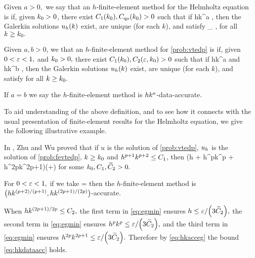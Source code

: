 \label{def:hkqo}
Given $a > 0,$ we say that an $h$-finite-element method for the Helmholtz equation is  if, given $k_{0} > 0$, there exist $C_{1}(k_{0}), C_{\mathrm{qo}}(k_{0}) > 0$ such that if
\beqs
hk^{a} \leq \Co,
\eeqs
then the Galerkin solutions $u_{h}(k)$ exist, are unique (for each $k$), and satisfy
\beqs
{} \leq \Cqo \inf_{\vh \in \Vhp} ,
\eeqs
for all $k \geq k_{0}.$
\ede

\label{def:hkdataacc}
Given $a,b>0$, we that an $h$-finite-element method for \cref{prob:vtedp} is  if, given $0 < \varepsilon < 1,$ and $k_{0} > 0,$ there exist $C_{1}(k_{0}), C_{2}(\varepsilon,k_{0}) > 0$ such that if
\beq\label{eq:hkdataacca}
hk^a \leq \Co
\eeq
and
\beq\label{eq:hkdataaccb}
hk^b \leq \Ct,
\eeq
then the Galerkin solutions $u_{h}(k)$ exist, are unique (for each $k$), and satisfy
\beq\label{eq:hkdataacc}
 \leq \eps
\eeq
for all $k \geq k_{0}.$

If $a=b$ we say the $h$-finite-element method is $hk^{a}$-data-accurate.
\ede

To aid understanding of the above definition, and to see how it connects with the usual presentation of finite-element results for the Helmholtz equation, we give the following illustrative example.

\label{rem:dataacc}
In \cite[Corollary 4.2]{ZhWu:13}, Zhu and Wu proved that if $u$ is the solution of \cref{prob:vtedp}, $u_{h}$ is the solution of \cref{prob:fevtedp}, $k \geq k_{0}$ and $h^{p+1}k^{p+2} \leq C_{1}$,  then
\beq\label{eq:hkacceg}
 \leq \Cttilde \mleft(h + h^pk^p + h^{2p}k^{2p+1}\mright)\mleft(+\NHhGI{\gI}\mright)
\eeq
for some $k_{0}, C_{1}, \widetilde{C}_{2} > 0.$

For $0 < \varepsilon < 1,$ if we take
\beq\label{eq:egmin}
\Ct = \min{}
\eeq
then the $h$-finite-element method is $\hk{(p+2)/(p+1)}{(2p+1)/(2p)}$-accurate.

When $hk^{(2p+1)/2p} \leq C_{2},$ the first term in \cref{eq:egmin} ensures $h \leq \eps/\mleft(3\Cttilde\mright),$ the second term in \cref{eq:egmin} ensures $h^pk^p \leq \eps/\mleft(3\Cttilde\mright),$ and the third term in \cref{eq:egmin} ensures $h^{2p}k^{2p+1} \leq \eps/\mleft(3\Cttilde\mright).$ Therefore by \cref{eq:hkacceg} the bound \cref{eq:hkdataacc} holds.

